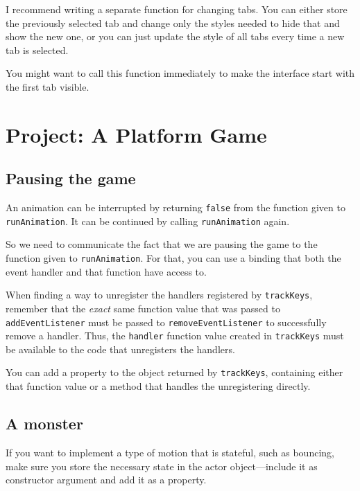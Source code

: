 I recommend writing a separate function for changing tabs. You can either store the previously selected tab and change only the styles needed to hide that and show the new one, or you can just update the style of all tabs every time a new tab is selected.

You might want to call this function immediately to make the interface start with the first tab visible.

\section{Project: A Platform Game}

\subsection{Pausing the game}

An animation can be interrupted by returning \lstinline`false` from the function given to \lstinline`runAnimation`. It can be continued by calling \lstinline`runAnimation` again.

So we need to communicate the fact that we are pausing the game to the function given to \lstinline`runAnimation`. For that, you can use a binding that both the event handler and that function have access to.

When finding a way to unregister the handlers registered by \lstinline`trackKeys`, remember that the \emph{exact} same function value that was passed to \lstinline`addEventListener` must be passed to \lstinline`removeEventListener` to successfully remove a handler. Thus, the \lstinline`handler` function value created in \lstinline`trackKeys` must be available to the code that unregisters the handlers.

You can add a property to the object returned by \lstinline`trackKeys`, containing either that function value or a method that handles the unregistering directly.

\subsection{A monster}

If you want to implement a type of motion that is stateful, such as bouncing, make sure you store the necessary state in the actor object—include it as constructor argument and add it as a property.

